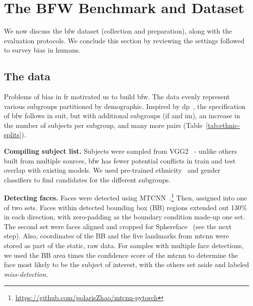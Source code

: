 \section{The BFW Benchmark and Dataset}


We now discuss the \gls{bfw} dataset (\ie collection and preparation), along with the evaluation protocols. We conclude this section by reviewing the settings followed to survey bias in humans.

\subsection{The data}
Problems of bias in \gls{fr} motivated us to build \gls{bfw}. The data evenly represent various subgroups partitioned by demographic. Inspired by \gls{dp}~\cite{demogPairs}, the specification of \gls{bfw} follows in suit, but with additional subgroups (\ie \gls{if} and \gls{im}), an increase in the number of subjects per subgroup, and many more pairs (Table~\ref{tab:ethnic-splits}). 




\vspace{1mm}
\noindent\textbf{Compiling subject list.} 
Subjects were sampled from VGG2~\cite{Cao18} - unlike others built from multiple sources, \gls{bfw} has fewer potential conflicts in train and test overlap with existing models. We used pre-trained ethnicity~\cite{ambekar2009name} and gender~\cite{levi2015age} classifiers to find candidates for the different subgroups.



\vspace{1mm}
\noindent\textbf{Detecting faces.} Faces were detected using MTCNN~\cite{zhang2016joint}.\footnote{\href{https://github.com/polarisZhao/mtcnn-pytorch}{https://github.com/polarisZhao/mtcnn-pytorch}} Then, assigned into one of two sets. Faces within detected bounding box (BB) regions extended out 130\% in each direction, with zero-padding as the boundary condition made-up one set. The second set were faces aligned and cropped for Sphereface~\cite{liu2017sphereface} (see the next step). Also, coordinates of the BB and the five landmarks from \gls{mtcnn} were stored as part of the static, raw data. For samples with multiple face detections, we used the BB area times the confidence score of the \gls{mtcnn} to determine the face most likely to be the subject of interest, with the others set aside and labeled \textit{miss-detection}. 




